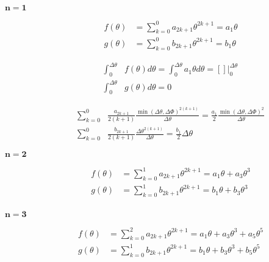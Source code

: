 \documentclass[review]{elsarticle}
\begin{document}
\begin{description}
\item[$\mathbf{n=1}$]

\begin{equation}
\begin{aligned}
f\left(\theta\right)&=\sum_{k=0}^{0}a_{2k+1}\theta^{2k+1}=a_{1}\theta\\
g\left(\theta\right)&=\sum_{k=0}^{0}b_{2k+1}\theta^{2k+1}=b_{1}\theta
\end{aligned}
\end{equation}

\begin{equation}
\begin{aligned}
\int_{0}^{\Delta\theta}&f\left(\theta\right)d\theta=\int_{0}^{\Delta\theta}a_{1}\theta d\theta=\left[\right]\Bigg\rvert_{0}^{\Delta\theta}\\
\int_{0}^{\Delta\theta}&g\left(\theta\right)d\theta=0
\end{aligned}
\end{equation}

\begin{equation}
\begin{aligned}
\sum_{k=0}^{0}&\frac{a_{2k+1}}{2\left(k+1\right)}\frac{\min\left(\Delta\theta,\Delta\Phi\right)^{2\left(k+1\right)}}{\Delta\theta}=\frac{a_{1}}{2}\frac{\min\left(\Delta\theta,\Delta\Phi\right)^{2}}{\Delta\theta}\\
\sum_{k=0}^{0}&\frac{b_{2k+1}}{2\left(k+1\right)}\frac{\Delta\theta^{2\left(k+1\right)}}{\Delta\theta}=\frac{b_{1}}{2}\Delta\theta
\end{aligned}
\end{equation}

\item[$\mathbf{n=2}$]

\begin{equation}
\begin{aligned}
f\left(\theta\right)&=\sum_{k=0}^{1}a_{2k+1}\theta^{2k+1}=a_{1}\theta+a_{3}\theta^{3}\\
g\left(\theta\right)&=\sum_{k=0}^{1}b_{2k+1}\theta^{2k+1}=b_{1}\theta+b_{3}\theta^{3}\\
\end{aligned}
\end{equation}

\item[$\mathbf{n=3}$]

\begin{equation}
\begin{aligned}
f\left(\theta\right)&=\sum_{k=0}^{2}a_{2k+1}\theta^{2k+1}=a_{1}\theta+a_{3}\theta^{3}+a_{5}\theta^{5}\\
g\left(\theta\right)&=\sum_{k=0}^{1}b_{2k+1}\theta^{2k+1}=b_{1}\theta+b_{3}\theta^{3}+b_{5}\theta^{5}\\
\end{aligned}
\end{equation}
\end{description}
\end{document}
